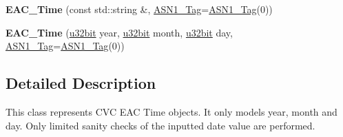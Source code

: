 \begin{DoxyCompactItemize}
\item 
\hypertarget{classBotan_1_1EAC__Time_ab21f196deeb5da8be5e3ca93d2f4777e}{{\bfseries E\-A\-C\-\_\-\-Time} (const std\-::string \&, \hyperlink{namespaceBotan_aaa08f67a945ef195fa39e62659dffa7a}{A\-S\-N1\-\_\-\-Tag}=\hyperlink{namespaceBotan_aaa08f67a945ef195fa39e62659dffa7a}{A\-S\-N1\-\_\-\-Tag}(0))}\label{classBotan_1_1EAC__Time_ab21f196deeb5da8be5e3ca93d2f4777e}

\item 
\hypertarget{classBotan_1_1EAC__Time_ad4df1f55c691928bf123cbe0048bc5e2}{{\bfseries E\-A\-C\-\_\-\-Time} (\hyperlink{namespaceBotan_aacc7d03c95e97e76168fc1c819031830}{u32bit} year, \hyperlink{namespaceBotan_aacc7d03c95e97e76168fc1c819031830}{u32bit} month, \hyperlink{namespaceBotan_aacc7d03c95e97e76168fc1c819031830}{u32bit} day, \hyperlink{namespaceBotan_aaa08f67a945ef195fa39e62659dffa7a}{A\-S\-N1\-\_\-\-Tag}=\hyperlink{namespaceBotan_aaa08f67a945ef195fa39e62659dffa7a}{A\-S\-N1\-\_\-\-Tag}(0))}\label{classBotan_1_1EAC__Time_ad4df1f55c691928bf123cbe0048bc5e2}

\end{DoxyCompactItemize}


\subsection{Detailed Description}
This class represents C\-V\-C E\-A\-C Time objects. It only models year, month and day. Only limited sanity checks of the inputted date value are performed. 

